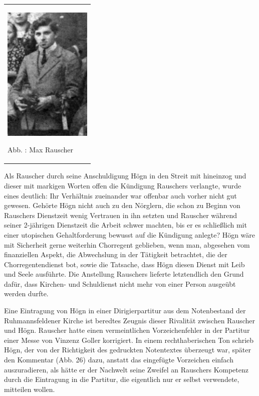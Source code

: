 \begin{center}
\begin{minipage}{4.591cm}
\begin{center}
\tablefirsthead{}
\tablehead{}
\tabletail{}
\tablelasttail{}
\begin{supertabular}{m{4.3910003cm}}

\includegraphics[width=4.209cm,height=6.507cm]{pictures/zulassungsarbeit-img027.jpg}

Abb. : Max Rauscher\\
\end{supertabular}
\end{center}
\end{minipage}
\end{center}
Als Rauscher durch seine Anschuldigung Högn in den Streit mit hineinzog
und dieser mit markigen Worten offen die Kündigung Rauschers verlangte,
wurde eines deutlich: Ihr Verhältnis zueinander war offenbar auch
vorher nicht gut gewesen. Gehörte Högn nicht auch zu den Nörglern, die
schon zu Beginn von Rauschers Dienstzeit wenig Vertrauen in ihn setzten
und Rauscher während seiner 2-jährigen Dienstzeit die Arbeit schwer
machten, bis er es schließlich mit einer utopischen Gehaltforderung
bewusst auf die Kündigung anlegte? Högn wäre mit Sicherheit gerne
weiterhin Chorregent geblieben, wenn man, abgesehen vom finanziellen
Aspekt, die Abwechslung in der Tätigkeit betrachtet, die der
Chorregentendienst bot, sowie die Tatsache, dass Högn diesen Dienst mit
Leib und Seele ausführte. Die Anstellung Rauschers lieferte
letztendlich den Grund dafür, dass Kirchen- und Schuldienst nicht mehr
von einer Person ausgeübt werden durfte.

Eine Eintragung von Högn in einer Dirigierpartitur aus dem Notenbestand
der Ruhmannsfeldener Kirche ist beredtes Zeugnis dieser Rivalität
zwischen Rauscher und Högn. Rauscher hatte einen vermeintlichen
Vorzeichenfehler in der Partitur einer Messe von Vinzenz Goller
korrigiert. In einem rechthaberischen Ton schrieb Högn, der von der
Richtigkeit des gedruckten Notentextes überzeugt war, später den
Kommentar (Abb. 26) dazu, anstatt das eingefügte Vorzeichen einfach
auszuradieren, als hätte er der Nachwelt seine Zweifel an Rauschers
Kompetenz durch die Eintragung in die Partitur, die eigentlich nur er
selbst verwendete, mitteilen wollen.

